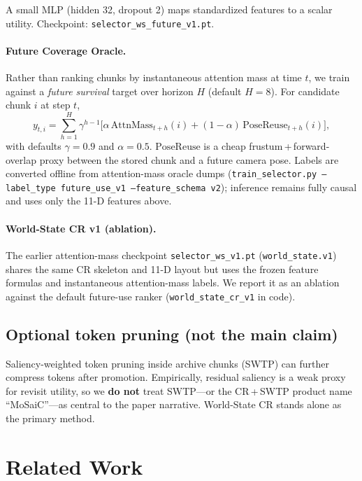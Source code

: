 \documentclass{article}
\begin{document}
A small MLP (hidden 32, dropout 2) maps standardized features to a scalar
utility.  Checkpoint: \texttt{selector\_ws\_future\_v1.pt}.

\paragraph{Future Coverage Oracle.}
Rather than ranking chunks by instantaneous attention mass at time $t$, we
train against a \emph{future survival} target over horizon $H$ (default
$H{=}8$).  For candidate chunk $i$ at step $t$,
\begin{equation}
  y_{t,i}
  =
  \sum_{h=1}^{H}
  \gamma^{h-1}
  \Big[
    \alpha\,\mathrm{AttnMass}_{t+h}(i)
    +
    (1-\alpha)\,\mathrm{PoseReuse}_{t+h}(i)
  \Big],
\end{equation}
with defaults $\gamma{=}0.9$ and $\alpha{=}0.5$.
$\mathrm{PoseReuse}$ is a cheap frustum\,+\,forward-overlap proxy between
the stored chunk and a future camera pose.  Labels are converted offline
from attention-mass oracle dumps (\texttt{train\_selector.py
--label\_type future\_use\_v1 --feature\_schema v2}); inference remains
fully causal and uses only the 11-D features above.

\paragraph{World-State CR v1 (ablation).}
The earlier attention-mass checkpoint \texttt{selector\_ws\_v1.pt}
(\texttt{world\_state.v1}) shares the same CR skeleton and 11-D layout but
uses the frozen feature formulas and instantaneous attention-mass labels.
We report it as an ablation against the default future-use ranker
(\texttt{world\_state\_cr\_v1} in code).

\subsection{Optional token pruning (not the main claim)}
Saliency-weighted token pruning inside archive chunks (SWTP) can further
compress tokens after promotion.  Empirically, residual saliency is a weak
proxy for revisit utility, so we \textbf{do not} treat SWTP---or the
CR\,+\,SWTP product name ``MoSaiC''---as central to the paper narrative.
World-State CR stands alone as the primary method.

\section{Related Work}
\label{sec:related}
\end{document}
